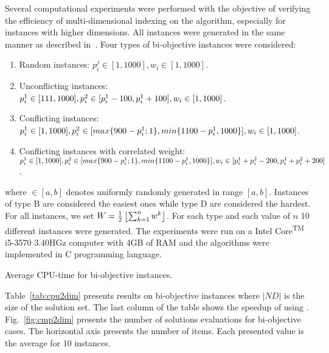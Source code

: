 Several computational experiments were performed with the objective of
verifying the efficiency of multi-dimensional indexing on the algorithm,
especially for instances with higher dimensions.
All instances were generated in the same manner as described in~\cite{bazgan2009}.
Four types of bi-objective instances were considered:
\begin{enumerate}[Type A)]
  \item Random instances: $
    p^j_i \in [1, 1000],
    w_i \in [1,1000]$.
  \item Unconflicting instances: $
    p^1_i \in [111, 1000],\\
    p^2_i \in [p^1_i - 100, p^1_i + 100],\\
    w_i \in [1,1000]$.
  \item Conflicting instances: $
    p^1_i \in [1, 1000],\\
    p^2_i \in [max\{900-p^1_i;1\}, min\{1100-p^1_i, 1000\}],\\
    w_i \in [1,1000]$.
  \item Conflicting instances with correlated weight: $
    p^1_i \in [1, 1000],\\
    p^2_i \in [max\{900-p^1_i;1\}, min\{1100-p^1_i, 1000\}],\\
    w_i \in [p^1_i+p^2_i-200, p^1_i+p^2_i+200]$.
\end{enumerate}
where $\in [a,b]$ denotes uniformly randomly generated in range $[a,b]$.
Instances of type B are considered the easiest ones
while type D are considered the hardest.
For all instances, we set $W=\frac{1}{2}\left \lfloor{\sum^n_{k=1} w^k}\right \rfloor$.
For each type and each value of $n$ 10 different instances were generated.
The experiments were run on a Intel\textsuperscript{\textregistered}
Core\textsuperscript{TM} i5-3570 3.40HGz computer with 4GB of RAM and
the algorithms were implemented in C programming language.

\begin{table}[H]
  \centering
  
  \caption{Average CPU-time for bi-objective instances.}
  \label{tab:cpu2dim}
\end{table}

Table~\ref{tab:cpu2dim} presents results on bi-objective instances
where $|ND|$ is the size of the solution set.
The last column of the table shows the speedup of using .
Fig.~\ref{fig:cmp2dim} presents the number of solutions
evaluations for bi-objective cases.
The horizontal axis presents the number of items.
Each presented value is the average for 10 instances.

